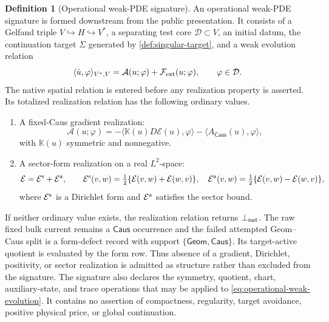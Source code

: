 \documentclass[11pt]{article}
\numberwithin{section}{part}
\theoremstyle{plain}
\theoremstyle{definition}
\newtheorem{definition}[definition]{Definition}
\theoremstyle{remark}
\newcommand{\Geom}{\mathsf{Geom}}
\newcommand{\Caus}{\mathsf{Caus}}
\newcommand{\Energy}{\mathcal E}
\begin{document}
\begin{definition}[Operational weak-PDE signature]
\label{def:operational-weak-pde-signature}
An operational weak-PDE signature is formed downstream from the public
presentation.  It consists of a Gelfand triple
\(V\hookrightarrow H\hookrightarrow V^*\), a separating test core
\(\mathcal D\subset V\), an initial datum, the continuation target \(\Sigma\)
generated by \cref{def:singular-target}, and a weak
evolution relation
\begin{equation}
 \label{eq:operational-weak-evolution}
 \langle \dot u,\varphi\rangle_{V^*,V}
 =\mathcal A(u;\varphi)+\mathcal F_{\rm ext}(u;\varphi),
 \qquad \varphi\in\mathcal D .
\end{equation}
The native spatial relation is entered before any realization property is
asserted.  Its totalized realization relation has the following ordinary
values.
\begin{enumerate}[label=\textup{(W\arabic*)}]
\item A fixed-Caus gradient realization:
\[
 \mathcal A(u;\varphi)
 =-\langle \mathbb K(u)D\Energy(u),\varphi\rangle
  -\langle A_{\Caus}(u),\varphi\rangle ,
\]
with \(\mathbb K(u)\) symmetric and nonnegative.
\item A sector-form realization on a real \(L^2\)-space:
\[
 \mathcal E=\mathcal E^{\rm s}+\mathcal E^{\rm a},
 \qquad
 \mathcal E^{\rm s}(v,w)
 =\tfrac12\{\mathcal E(v,w)+\mathcal E(w,v)\},
 \quad
 \mathcal E^{\rm a}(v,w)
 =\tfrac12\{\mathcal E(v,w)-\mathcal E(w,v)\},
\]
where \(\mathcal E^{\rm s}\) is a Dirichlet form and
\(\mathcal E^{\rm a}\) satisfies the sector bound.
\end{enumerate}
If neither ordinary value exists, the realization relation returns
\(\bot_{\rm nat}\).  The raw fixed bulk current remains a \(\Caus\) occurrence
and the failed attempted Geom--Caus split is a form-defect record with support
\(\{\Geom,\Caus\}\).  Its target-active quotient is evaluated by the form
row.  Thus absence of a gradient, Dirichlet, positivity, or sector
realization is admitted as structure rather than excluded from the signature.
The signature also declares the symmetry, quotient, chart, auxiliary-state,
and trace operations that may be applied to
\eqref{eq:operational-weak-evolution}.  It contains no assertion of
compactness, regularity, target avoidance, positive physical price, or global
continuation.
\end{definition}
\end{document}
